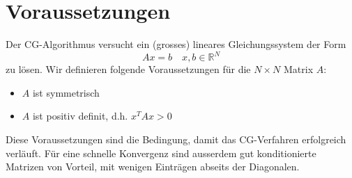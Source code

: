\section{Voraussetzungen\label{cg:section:voraussetzungen}}

Der CG-Algorithmus versucht ein (grosses) lineares Gleichungssystem der Form
\begin{equation}
Ax = b \quad x, b \in \mathbb{R}^N
\end{equation}
zu lösen.
Wir definieren folgende Voraussetzungen für die $N\times N$ Matrix $A$:
\begin{itemize}
	\item $A$ ist symmetrisch
	\item $A$ ist positiv definit, d.h. $x^T A x > 0$
\end{itemize}
Diese Voraussetzungen sind die Bedingung, damit das CG-Verfahren erfolgreich verläuft.
Für eine schnelle Konvergenz sind ausserdem gut konditionierte Matrizen von Vorteil, mit wenigen Einträgen abseits der Diagonalen.